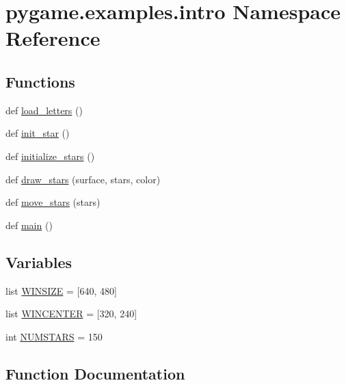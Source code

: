 \hypertarget{namespacepygame_1_1examples_1_1intro}{}\section{pygame.\+examples.\+intro Namespace Reference}
\label{namespacepygame_1_1examples_1_1intro}
\subsection*{Functions}
\begin{DoxyCompactItemize}
\item 
def \hyperlink{namespacepygame_1_1examples_1_1intro_a53369593a41bc6c6dde4cc5850d84de4}{load\+\_\+letters} ()
\item 
def \hyperlink{namespacepygame_1_1examples_1_1intro_a67b49a95572d15765e3c2aac1e65c15c}{init\+\_\+star} ()
\item 
def \hyperlink{namespacepygame_1_1examples_1_1intro_a5841b64cbd7f5e798487234335ae1046}{initialize\+\_\+stars} ()
\item 
def \hyperlink{namespacepygame_1_1examples_1_1intro_af359dccceabe7dfdaaf4b8a3fc5e4e83}{draw\+\_\+stars} (surface, stars, color)
\item 
def \hyperlink{namespacepygame_1_1examples_1_1intro_a60f66580c3ae192f1477f1995628b55b}{move\+\_\+stars} (stars)
\item 
def \hyperlink{namespacepygame_1_1examples_1_1intro_a0e3fd9e4f15a38cfb885f07b651e6c7f}{main} ()
\end{DoxyCompactItemize}
\subsection*{Variables}
\begin{DoxyCompactItemize}
\item 
list \hyperlink{namespacepygame_1_1examples_1_1intro_a3ad04578b8915fe2b4ea41d331284eb8}{W\+I\+N\+S\+I\+ZE} = \mbox{[}640, 480\mbox{]}
\item 
list \hyperlink{namespacepygame_1_1examples_1_1intro_ac0b6aa0d03ee7b20b9a6f8aa31cbaa84}{W\+I\+N\+C\+E\+N\+T\+ER} = \mbox{[}320, 240\mbox{]}
\item 
int \hyperlink{namespacepygame_1_1examples_1_1intro_ad9765badba220e64c08f76862170fe02}{N\+U\+M\+S\+T\+A\+RS} = 150
\end{DoxyCompactItemize}


\subsection{Function Documentation}
\mbox{\label{namespacepygame_1_1examples_1_1intro_af359dccceabe7dfdaaf4b8a3fc5e4e83}} 
